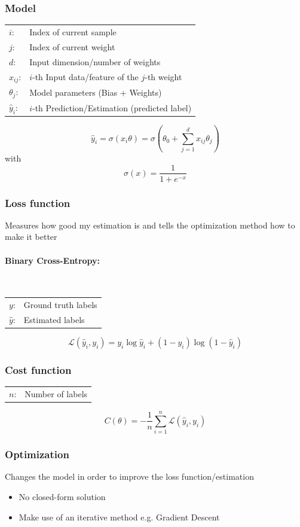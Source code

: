 \documentclass[10pt,a4paper]{article}
\begin{document}
\subsubsection{Model}
\begin{tabular}{ll}
	$i$: & Index of current sample \\
	$j$: & Index of current weight \\
	$d$: & Input dimension/number of weights \\
	$x_{ij}$: & $i$-th Input data/feature of the $j$-th weight \\
	$\theta_j$: & Model parameters (Bias + Weights)\\
	$\hat y_i$: & $i$-th Prediction/Estimation (predicted label)
\end{tabular}

$$
	\hat y_i = \sigma(x_i \theta) = \sigma \left(\theta_0 + \sum_{j = 1}^d x_{ij} \theta_j \right)
$$
with
$$
	\sigma(x) = \frac 1 {1 + e^{-x}}
$$

\subsubsection{Loss function}
Measures how good my estimation is and tells the optimization method how to make it better

\paragraph{Binary Cross-Entropy:} ~\\
\begin{tabular}{ll}
	$y$: & Ground truth labels \\
	$\hat y$: & Estimated labels
\end{tabular}
$$
	\mathcal L(\hat y_i, y_i) = y_i \log \hat y_i + (1 - y_i) \log (1 - \hat y_i)
$$

\subsubsection{Cost function}
\begin{tabular}{ll}
	$n$: & Number of labels
\end{tabular}
$$
	C(\theta) = - \frac 1 n \sum_{i = 1}^n \mathcal L(\hat y_i, y_i)
$$

\subsubsection{Optimization}
Changes the model in order to improve the loss function/estimation
\begin{itemize}
	\item No closed-form solution
	\item Make use of an iterative method e.g. Gradient Descent
\end{itemize}
\end{document}
